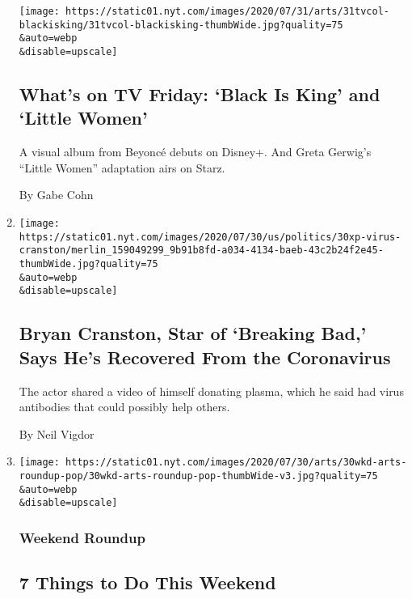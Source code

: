 \begin{enumerate}
  \texttt{[image: https://static01.nyt.com/images/2020/07/31/arts/31tvcol-blackisking/31tvcol-blackisking-thumbWide.jpg?quality=75\\\&auto=webp\\\&disable=upscale]}

  \hypertarget{whats-on-tv-friday-black-is-king-and-little-women}{%
  \subsection{What's on TV Friday: `Black Is King' and `Little
  Women'}\label{whats-on-tv-friday-black-is-king-and-little-women}}

  A visual album from Beyoncé debuts on Disney+. And Greta Gerwig's
  ``Little Women'' adaptation airs on Starz.

  By Gabe Cohn
\item
  \href{/2020/07/31/arts/television/bryan-cranston-coronavirus-plasma.html}{}

  \texttt{[image: https://static01.nyt.com/images/2020/07/30/us/politics/30xp-virus-cranston/merlin\_159049299\_9b91b8fd-a034-4134-baeb-43c2b24f2e45-thumbWide.jpg?quality=75\\\&auto=webp\\\&disable=upscale]}

  \hypertarget{bryan-cranston-star-of-breaking-bad-says-hes-recovered-from-the-coronavirus}{%
  \subsection{Bryan Cranston, Star of `Breaking Bad,' Says He's
  Recovered From the
  Coronavirus}\label{bryan-cranston-star-of-breaking-bad-says-hes-recovered-from-the-coronavirus}}

  The actor shared a video of himself donating plasma, which he said had
  virus antibodies that could possibly help others.

  By Neil Vigdor
\item
  \href{/2020/07/30/arts/things-to-do-weekend-coronavirus.html}{}

  \texttt{[image: https://static01.nyt.com/images/2020/07/30/arts/30wkd-arts-roundup-pop/30wkd-arts-roundup-pop-thumbWide-v3.jpg?quality=75\\\&auto=webp\\\&disable=upscale]}

  \hypertarget{weekend-roundup}{%
  \subsubsection{Weekend Roundup}\label{weekend-roundup}}

  \hypertarget{7-things-to-do-this-weekend}{%
  \subsection{7 Things to Do This
  Weekend}\label{7-things-to-do-this-weekend}}


\end{enumerate}
